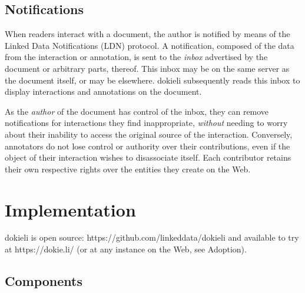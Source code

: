 \documentclass[a4paper]{llncs}
\begin{document}
                            

                            
                                \subsection{Notifications}
  \label{notifications}

                                
                                    
\par When readers interact with a document, the author is notified by means of the \empty Linked Data Notifications (LDN) protocol. A notification, composed of the data from the interaction or annotation, is sent to the {\em inbox} advertised by the document or arbitrary parts, thereof. This inbox may be on the same server as the document itself, or may be elsewhere. dokieli subsequently reads this inbox to display interactions and annotations on the document.

                                    
\par As the {\em author} of the document has control of the inbox, they can remove notifications for interactions they find inappropriate, {\em without} needing to worry about their inability to access the original source of the interaction. Conversely, annotators do not lose control or authority over their contributions, even if the object of their interaction wishes to disassociate itself. Each contributor retains their own respective rights over the entities they create on the Web.
                                
                            
                        
                    

                    
                        \section{Implementation}
  \label{implementation}

                        
                            
\par dokieli is open source: \empty https://github.com/linkeddata/dokieli and available to try at \empty https://dokie.li/ (or at any instance on the Web, see \empty Adoption).

                            
                                \subsection{Components}
  \label{components}
\end{document}
